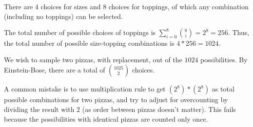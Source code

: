 There are $4$ choices for sizes and $8$ choices for toppings, of which any
combination (including no toppings) can be selected.

The total number of possible choices of toppings is $\sum_{i=0}^{8}\binom{8}
{i} = 2^8 = 256$. Thus, the total number of possible size-topping combinations
is $4 * 256 = 1024$.

We wish to sample two pizzas, with replacement, out of the $1024$ possibilities.
By Einstein-Bose, there are a total of $\binom{1025}{2}$ choices.

A common mistake is to use multiplication rule to get $(2^8)*(2^8)$ as 
total possible combinations for two pizzas, and try to adjust for overcounting
by dividing the result with 2 (as order between pizzas doesn't matter). This 
fails because the possibilities with identical pizzas are counted only once.